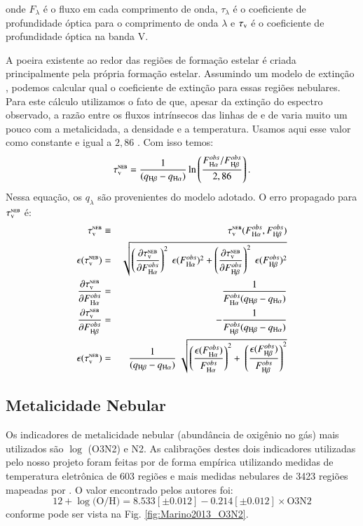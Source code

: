\noindent onde $F_\lambda$ é o fluxo em cada comprimento de onda, $\tau_\lambda$ é o coeficiente de
profundidade óptica para o comprimento de onda $\lambda$ e $\tau_{\mathrm{\textsc{v}}}$ é o coeficiente de profundidade
óptica na banda V.

A poeira existente ao redor das regiões de formação estelar é criada principalmente pela própria
formação estelar. Assumindo um modelo de extinção \citep[neste trabalho assumimos][]{CCM1989a},
podemos calcular qual o coeficiente de extinção para essas regiões nebulares. Para este cálculo
utilizamos o fato de que, apesar da extinção do espectro observado, a razão entre os fluxos
intrínsecos das linhas de \Halpha e de \Hbeta varia muito um pouco com a metalicidada, a densidade
e a temperatura. Usamos aqui esse valor como constante e igual a $2,86$
\citep{Osterbrock.Ferland.2006a}. Com isso temos:
\begin{equation}
	\tauVN = \frac{1}{(q_{\Hbeta} - q_{\Halpha})} \ln \left( \frac{F_{\Halpha}^{obs}/F_{\Hbeta}^{obs}}{2,86} \right).
\end{equation}
\noindent Nessa equação, os $q_\lambda$ são provenientes do modelo adotado. O erro propagado para
$\tau_{\mathrm{\textsc{v}}}^{\mathrm{\textsc{neb}}}$ é:
\begin{eqnarray}
	\tauVN &\equiv& \tauVN(F_{\Halpha}^{obs}, F_{\Hbeta}^{obs}) \\
	\epsilon (\tauVN) &=& \sqrt{\left(\del{\tauVN}{F_{\Halpha}^{obs}}\right)^2 \
\epsilon (F_{\Halpha}^{obs})^2 + \left(\del{\tauVN}{F_{\Hbeta}^{obs}}\right)^2 \
\epsilon (F_{\Hbeta}^{obs})^2 } \\
	\del{\tauVN}{F_{\Halpha}^{obs}} &=& \frac{1}{F_{\Halpha}^{obs} (q_{\Hbeta} - q_{\Halpha})} \\
	\del{\tauVN}{F_{\Hbeta}^{obs}} &=& - \frac{1}{F_{\Hbeta}^{obs} (q_{\Hbeta} - q_{\Halpha})} \\
	\epsilon (\tauVN) &=& \frac{1}{(q_{\Hbeta} - q_{\Halpha})} \
\sqrt{\left(\frac{\epsilon (F_{\Halpha}^{obs})}{F_{\Halpha}^{obs}}\right)^2 + \
\left(\frac{\epsilon (F_{\Hbeta}^{obs})}{F_{\Hbeta}^{obs}}\right)^2 }
\end{eqnarray}

\subsection{Metalicidade Nebular}
\label{sec:emline:datacube:Zneb}

Os indicadores de metalicidade nebular (abundância de oxigênio no gás) mais utilizados são $\log$
(O3N2) e N2. As calibrações destes dois indicadores utilizadas pelo nosso projeto foram feitas por
\citet{Marino.etal.2013a} de forma empírica utilizando medidas de temperatura eletrônica de 603
regiões \Hii e mais medidas nebulares de 3423 regiões \Hii mapeadas por \citet{Sanchez.etal.2013a}.
O valor encontrado pelos autores foi:
\begin{equation}
	12 + \log \textrm{(O/H)} = 8.533[\pm0.012] - 0.214[\pm0.012]\times \textrm{O3N2}
\end{equation}
\noindent conforme pode ser vista na Fig. \ref{fig:Marino2013_O3N2}.

